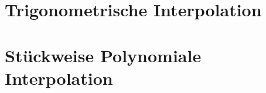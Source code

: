 \documentclass{article}
\begin{document}
\newsection
\section{Trigonometrische Interpolation}











\newsection
\section{Stückweise Polynomiale Interpolation}




\newsection

\end{document}
